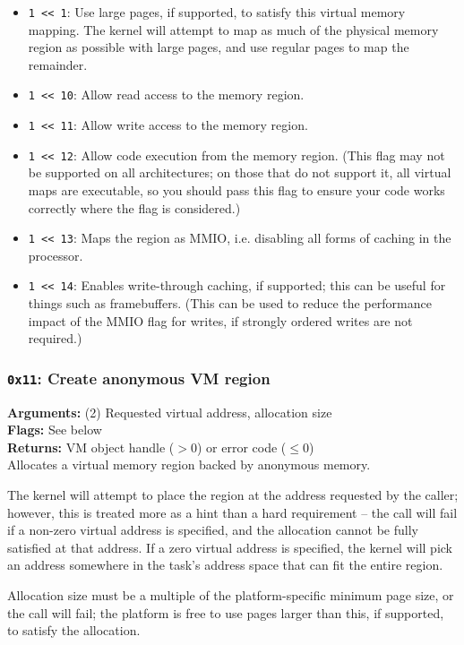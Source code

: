 \documentclass[11pt]{article}
\begin{document}
\begin{itemize}
\item \texttt{1 << 1}: Use large pages, if supported, to satisfy this virtual memory mapping. The kernel will attempt to map as much of the physical memory region as possible with large pages, and use regular pages to map the remainder.
\item \texttt{1 << 10}: Allow read access to the memory region.
\item \texttt{1 << 11}: Allow write access to the memory region.
\item \texttt{1 << 12}: Allow code execution from the memory region. (This flag may not be supported on all architectures; on those that do not support it, all virtual maps are executable, so you should pass this flag to ensure your code works correctly where the flag is considered.)
\item \texttt{1 << 13}: Maps the region as MMIO, i.e. disabling all forms of caching in the processor.
\item \texttt{1 << 14}: Enables write-through caching, if supported; this can be useful for things such as framebuffers. (This can be used to reduce the performance impact of the MMIO flag for writes, if strongly ordered writes are not required.)
\end{itemize}

\subsubsection{{\tt 0x11}: Create anonymous VM region}
\textbf{Arguments:} (2) Requested virtual address, allocation size  \\
\textbf{Flags:} See below \\
\textbf{Returns:} VM object handle ($>0$) or error code ($\leq0$) \\

Allocates a virtual memory region backed by anonymous memory.

The kernel will attempt to place the region at the address requested by the caller; however, this is treated more as a hint than a hard requirement -- the call will fail if a non-zero virtual address is specified, and the allocation cannot be fully satisfied at that address. If a zero virtual address is specified, the kernel will pick an address somewhere in the task's address space that can fit the entire region.

Allocation size must be a multiple of the platform-specific minimum page size, or the call will fail; the platform is free to use pages larger than this, if supported, to satisfy the allocation.
\end{document}
